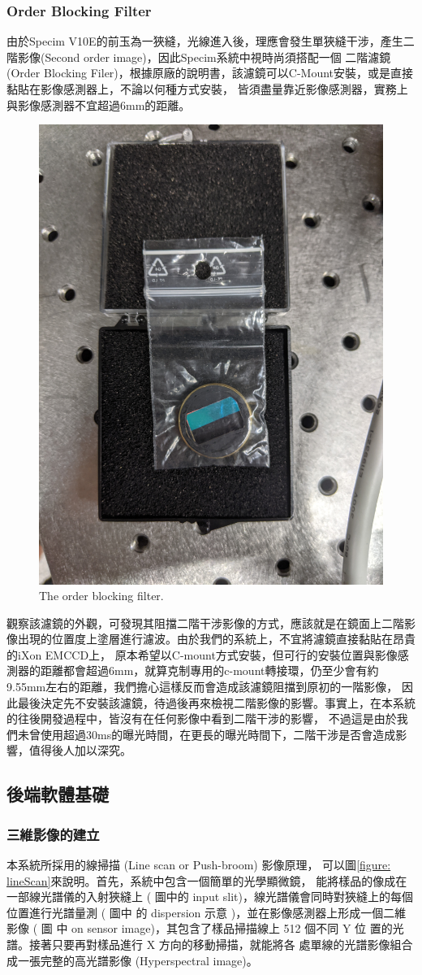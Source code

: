 \documentclass[12pt]{article}
\begin{document}
\subsubsection{Order Blocking Filter}
由於Specim V10E的前玉為一狹縫，光線進入後，理應會發生單狹縫干涉，產生二階影像(Second order image)，因此Specim系統中視時尚須搭配一個
二階濾鏡(Order Blocking Filer)，根據原廠的說明書，該濾鏡可以C-Mount安裝，或是直接黏貼在影像感測器上，不論以何種方式安裝，
皆須盡量靠近影像感測器，實務上與影像感測器不宜超過6mm的距離\cite{manual}。
\begin{figure}[t]
    \centering
    \includegraphics[width=0.5\linewidth]{PXL_20210723_094341395.jpg}
    \caption{The order blocking filter.}
    \label{figure: obf}
\end{figure}
觀察該濾鏡的外觀，可發現其阻擋二階干涉影像的方式，應該就是在鏡面上二階影像出現的位置度上塗層進行濾波。由於我們的系統上，不宜將濾鏡直接黏貼在昂貴的iXon EMCCD上，
原本希望以C-mount方式安裝，但可行的安裝位置與影像感測器的距離都會超過6mm，就算克制專用的c-mount轉接環，仍至少會有約9.55mm左右的距離，我們擔心這樣反而會造成該濾鏡阻擋到原初的一階影像，
因此最後決定先不安裝該濾鏡，待過後再來檢視二階影像的影響。事實上，在本系統的往後開發過程中，皆沒有在任何影像中看到二階干涉的影響，
不過這是由於我們未曾使用超過30ms的曝光時間，在更長的曝光時間下，二階干涉是否會造成影響，值得後人加以深究。
\subsection{後端軟體基礎}
\subsubsection{三維影像的建立}
本系統所採用的線掃描 (Line scan or Push-broom) 影像原理，
可以圖\ref{figure: lineScan}來說明。首先，系統中包含一個簡單的光學顯微鏡，
能將樣品的像成在一部線光譜儀的入射狹縫上 ( 圖中的 input
slit)，線光譜儀會同時對狹縫上的每個位置進行光譜量測 ( 圖中
的 dispersion 示意 )，並在影像感測器上形成一個二維影像 ( 圖
中 on sensor image)，其包含了樣品掃描線上 512 個不同 Y 位
置的光譜。接著只要再對樣品進行 X 方向的移動掃描，就能將各
處單線的光譜影像組合成一張完整的高光譜影像 (Hyperspectral
image)。
\end{document}
